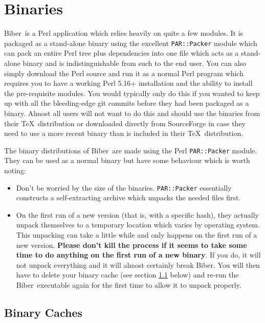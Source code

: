 \documentclass{ltxdockit}
\newcommand*{\biber}{Biber\xspace}
\begin{document}
\section{Binaries}\label{binaries}

\biber\ is a Perl application which relies heavily on quite a few
modules. It is packaged as a stand-alone binary using the excellent
\verb+PAR::Packer+ module which can pack an entire Perl tree plus
dependencies into one file which acts as a stand-alone binary and is
indistinguishable from such to the end user. You can also simply download
the Perl source and run it as a normal Perl program which
requires you to have a working Perl 5.16+ installation and the
ability to install the pre-requisite modules. You would typically only do
this if you wanted to keep up with all the bleeding-edge git commits before
they had been packaged as a binary. Almost all users will not want to do
this and should use the binaries from their \TeX\ distribution or downloaded
directly from SourceForge in case they need to use a more recent binary
than is included in their \TeX\ distribution.

The binary distributions of \biber\ are made using the Perl \verb+PAR::Packer+
module. They can be used as a normal binary but have some behaviour which
is worth noting:

\begin{itemize}
\item Don't be worried by the size of the binaries. \verb+PAR::Packer+ essentially
  constructs a self-extracting archive which unpacks the needed files first.
\item On the first run of a new version (that is, with a specific hash),
  they actually unpack themselves to a temporary location which varies by
  operating system. This unpacking can take a little while and only happens
  on the first run of a new version. \textbf{Please don't kill the process
    if it seems to take some time to do anything on the first run of a new
    binary}. If you do, it will not unpack everything and it will almost
  certainly break \biber. You will then have to delete your binary
  cache (see section \ref{bc} below) and re-run the \biber\ executable
  again for the first time to allow it to unpack properly.
\end{itemize}

\subsection{Binary Caches}\label{bc}
\end{document}
